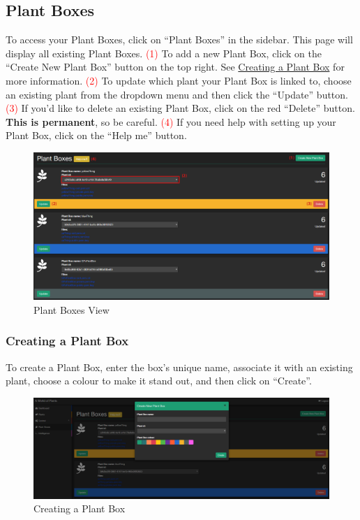 \documentclass{article}
\begin{document}
	\subsection{Plant Boxes}
	To access your Plant Boxes, click on ``Plant Boxes'' in the sidebar. This page will display all existing Plant Boxes.
	\newline
	\textcolor{red}{(1)} To add a new Plant Box, click on the ``Create New Plant Box'' button on the top right. See \hyperref[sec:creating-a-plant-box]{Creating a Plant Box} for more information.
	\newline
	\textcolor{red}{(2)} To update which plant your Plant Box is linked to, choose an existing plant from the dropdown menu and then click the ``Update'' button.
	\newline
	\textcolor{red}{(3)} If you'd like to delete an existing Plant Box, click on the red ``Delete'' button. \textbf{This is permanent}, so be careful.  
	\newline
	\textcolor{red}{(4)} If you need help with setting up your Plant Box, click on the ``Help me'' button.	
	
	\begin{figure}[H]
		\includegraphics[width=\textwidth]{../images/UserManual/plant-boxes.png}
		\caption{Plant Boxes View}
	\end{figure}	
	
	\subsubsection{Creating a Plant Box}
	\label{sec:creating-a-plant-box}
	To create a Plant Box, enter the box's unique name, associate it with an existing plant, choose a colour to make it stand out, and then click on ``Create''.
	\begin{figure}[H]
		\includegraphics[width=\textwidth]{../images/UserManual/create-plant-box.png}
		\caption{Creating a Plant Box}
	\end{figure}
	
\end{document}
